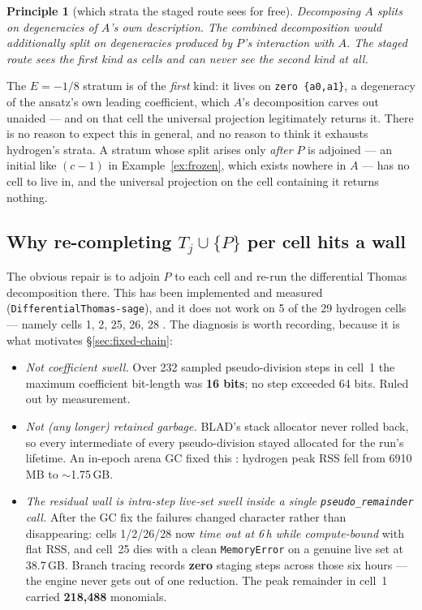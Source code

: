 \documentclass[11pt]{article}
\newcommand{\code}[1]{\texttt{#1}}
\newtheorem{principle}{Principle}
\begin{document}
\begin{principle}[which strata the staged route sees for free]
\label{prin:two-kinds}
Decomposing $A$ splits on \emph{degeneracies of $A$'s own description}. The
combined decomposition would additionally split on \emph{degeneracies
produced by $P$'s interaction with $A$}. The staged route sees the first kind
as cells and can never see the second kind at all.
\end{principle}

The $E=-1/8$ stratum is of the \emph{first} kind: it lives on
\code{zero \{a0,a1\}}, a degeneracy of the ansatz's own leading coefficient,
which $A$'s decomposition carves out unaided --- and on that cell the
universal projection legitimately returns it. There is no reason to expect
this in general, and no reason to think it exhausts hydrogen's strata. A
stratum whose split arises only \emph{after} $P$ is adjoined --- an initial
like $(c-1)$ in Example~\ref{ex:frozen}, which exists nowhere in $A$ --- has
no cell to live in, and the universal projection on the cell containing it
returns nothing.

\subsection{Why re-completing $T_j \cup \{P\}$ per cell hits a wall}
\label{sec:staging-wall}

The obvious repair is to adjoin $P$ to each cell and re-run the differential
Thomas decomposition there. This has been implemented and measured
(\code{DifferentialThomas-sage}), and it does not work on
5 of the 29 hydrogen cells --- namely cells 1, 2, 25, 26, 28
\cite{staging-swell}. The diagnosis is worth recording, because it is what
motivates \S\ref{sec:fixed-chain}:

\begin{itemize}
\item \emph{Not coefficient swell.} Over 232 sampled pseudo-division steps in
  cell~1 the maximum coefficient bit-length was \textbf{16 bits}; no step
  exceeded 64 bits. Ruled out by measurement.
\item \emph{Not (any longer) retained garbage.} BLAD's stack allocator never
  rolled back, so every intermediate of every pseudo-division stayed
  allocated for the run's lifetime. An in-epoch arena GC fixed this
  \cite{arena-gc}: hydrogen peak RSS fell from 6910\,MB to $\sim$1.75\,GB.
\item \emph{The residual wall is intra-step live-set swell inside a single
  \code{pseudo\_remainder} call.} After the GC fix the failures changed
  character rather than disappearing: cells 1/2/26/28 now \emph{time out at
  6\,h while compute-bound} with flat RSS, and cell~25 dies with a clean
  \code{MemoryError} on a genuine live set at 38.7\,GB. Branch tracing records
  \textbf{zero} staging steps across those six hours --- the engine never gets
  out of one reduction. The peak remainder in cell~1 carried
  \textbf{218{,}488} monomials.
\end{itemize}
\end{document}

